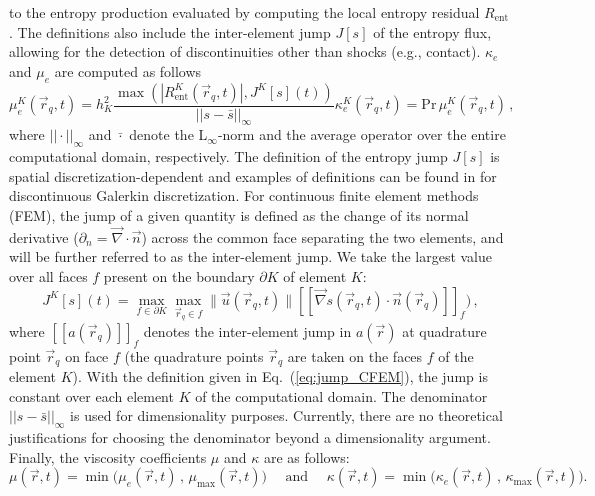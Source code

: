 \documentclass[preprint,10pt]{elsarticle}
\newcommand{\grad}{\vec{\nabla}}
\newcommand{\jmp}[1]{[\![#1]\!]}                     %
\renewcommand{\Pr}{\textrm{Pr}}
\newcommand{\resi}{R_\text{ent}}
\newcommand{\eqt}[1]{Eq.~(\ref{#1})}                     %
\begin{document}
to the entropy production evaluated by computing the local entropy residual $\resi$. The definitions also include the 
inter-element jump $J[s]$ of the entropy flux, %
allowing for the detection of discontinuities other than shocks (e.g., contact). $\kappa_e$ and $\mu_e$ are computed 
as follows
%
\begin{subequations}
\label{eq:ent_visc_coeff}
\begin{equation}
\mu^K_e(\vec{r}_q,t) =  h_K^2 \frac{\max\left( | \resi^K(\vec{r}_q,t) |, J^K[s](t) \right)}{|| s - \bar{s} ||_\infty}  
\end{equation}
\begin{equation}
\kappa^K_e(\vec{r}_q,t) = \Pr \, \mu^K_e(\vec{r}_q,t) \,,
\end{equation}
\end{subequations}
%
where $|| \cdot ||_\infty$ and $\bar{\cdot}$ denote the L$_\infty$-norm and the average operator over the entire 
computational domain, respectively. The definition of the entropy jump $J[s]$ is spatial discretization-dependent 
and examples of definitions can be found in \cite{valentin} for discontinuous Galerkin discretization. For 
continuous finite element methods (FEM), the jump of a given quantity is defined as the change of its normal 
derivative ($\partial_n = \grad \cdot \vec{n}$) across the common face separating the two elements, and will 
be further referred to as the inter-element jump. We take the largest value over all faces $f$ present on the 
boundary $\partial K$ of element $K$:
%
\begin{equation}
\label{eq:jump_CFEM}
J^K[s](t) = \max_{f\in\partial K}  \max_{\vec{r}_q \in f} \Big \| \vec{u}(\vec{r}_q,t) \| \jmp{\grad s(\vec{r}_q,t) \cdot \vec{n}(\vec{r}_q) }_f \Big) \, ,
\end{equation}
%
where $\jmp{a(\vec{r}_q)}_f$ denotes the inter-element jump in $a(\vec{r})$ at quadrature point $\vec{r}_q$ on face $f$ 
(the quadrature points $\vec{r}_q$ are taken on the faces $f$ of the element $K$). With the definition given in 
\eqt{eq:jump_CFEM}, the jump is constant over each element $K$ of the computational domain. 
The denominator $|| s - \bar{s} ||_\infty$ is used for dimensionality purposes.
Currently, there are no theoretical justifications for choosing the denominator beyond a dimensionality argument. 
Finally, the viscosity coefficients $\mu$ and $\kappa$ are as follows:
%
\begin{equation}
\mu(\vec{r},t)    = \min\Big( \mu_e(\vec{r},t)   \,,\, \mu_{\max}(\vec{r},t)    \Big) 
\quad \text{ and } \quad 
\kappa(\vec{r},t) = \min\Big( \kappa_e(\vec{r},t)\,,\, \kappa_{\max}(\vec{r},t) \Big).
\end{equation}
\end{document}
